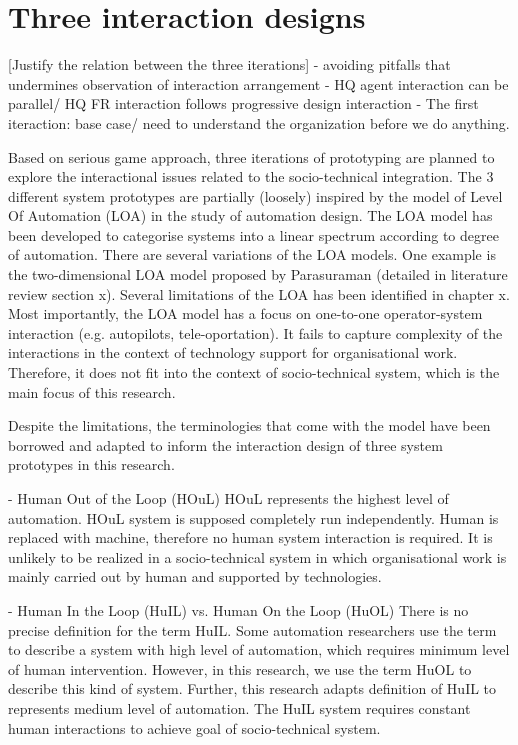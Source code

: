 \section{Three interaction designs}

[Justify the relation between the three iterations]
- avoiding pitfalls that undermines observation of interaction arrangement
- HQ agent interaction can be parallel/ HQ FR interaction follows progressive design interaction
- The first iteraction: base case/ need to understand the organization before we do anything.

Based on serious game approach, three iterations of prototyping are planned to explore the interactional issues related to the socio-technical integration. The 3 different system prototypes are partially (loosely) inspired by the model of Level Of Automation (LOA) in the study of automation design. The LOA model has been developed to categorise systems into a linear spectrum according to degree of automation. There are several variations of the LOA models. One example is the two-dimensional LOA model proposed by Parasuraman (detailed in literature review section x). Several limitations of the LOA has been identified in chapter x. Most importantly, the LOA model has a focus on one-to-one operator-system interaction (e.g. autopilots, tele-oportation). It fails to capture complexity of the interactions in the context of technology support for organisational work. Therefore, it does not fit into the context of socio-technical system, which is the main focus of this research. 

Despite the limitations, the terminologies that come with the model have been borrowed and adapted to inform the interaction design of three system prototypes in this research. 

- Human Out of the Loop (HOuL)
HOuL represents the highest level of automation. HOuL system is supposed completely run independently. Human is replaced with machine, therefore no human system interaction is required. It is unlikely to be realized in a socio-technical system in which organisational work is mainly carried out by human and supported by technologies.

- Human In the Loop (HuIL) vs. Human On the Loop (HuOL)
There is no precise definition for the term HuIL. Some automation researchers use the term to describe a system with high level of automation, which requires minimum level of human intervention. However, in this research, we use the term HuOL to describe this kind of system. Further, this research adapts definition of HuIL to represents medium level of automation. The HuIL system requires constant human interactions to achieve goal of socio-technical system.

